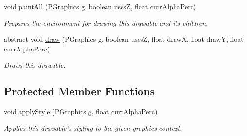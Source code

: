 \begin{DoxyCompactItemize}
\item 
void \hyperlink{classhype_1_1drawable_1_1_h_drawable_a54e5a75afb23f49b37ce769a11d10fb0}{paint\-All} (P\-Graphics g, boolean uses\-Z, float curr\-Alpha\-Perc)
\begin{DoxyCompactList}\small\item\em Prepares the environment for drawing this drawable and its children. \end{DoxyCompactList}\item 
abstract void \hyperlink{classhype_1_1drawable_1_1_h_drawable_a8e0af2cfaa89a93b3dab6b5f0ecdf964}{draw} (P\-Graphics g, boolean uses\-Z, float draw\-X, float draw\-Y, float curr\-Alpha\-Perc)
\begin{DoxyCompactList}\small\item\em Draws this drawable. \end{DoxyCompactList}\end{DoxyCompactItemize}
\subsection*{Protected Member Functions}
\begin{DoxyCompactItemize}
\item 
void \hyperlink{classhype_1_1drawable_1_1_h_drawable_a1888aed57c719a397222b9e82ed08a4e}{apply\-Style} (P\-Graphics g, float curr\-Alpha\-Perc)
\begin{DoxyCompactList}\small\item\em Applies this drawable's styling to the given graphics context. \end{DoxyCompactList}\end{DoxyCompactItemize}
